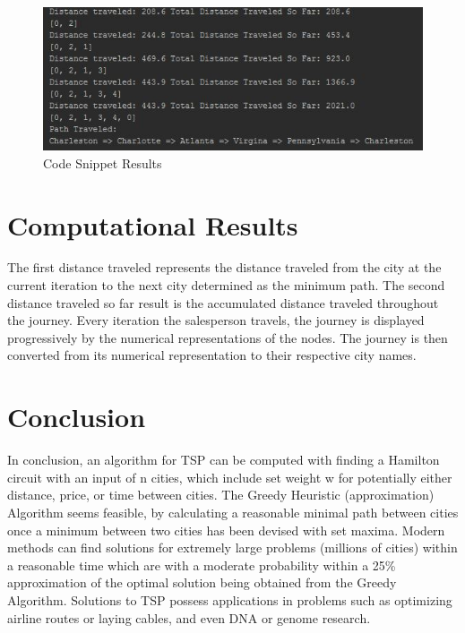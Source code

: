 \documentclass[a4paper,11pt]{scrartcl}
\begin{document}
\begin{figure}[!h]
  \centering
  \begin{minipage}[b]{0.85\textwidth}
    \includegraphics[width=\textwidth]{igraphprojectsnippet}
    \caption{Code Snippet Results}
  \end{minipage}
\end{figure}

\section{Computational Results}

The first distance traveled represents the distance traveled from the city at the current iteration to the next city determined as the minimum path. The second distance traveled so far result is the accumulated distance traveled throughout the journey. Every iteration the salesperson travels, the journey is displayed progressively by the numerical representations of the nodes. The journey is then converted from its numerical representation to their respective city names.

\section{Conclusion}

In conclusion, an algorithm for TSP can be computed with finding a Hamilton circuit with an input of n cities, which include set weight w for potentially either distance, price, or time between cities. The Greedy Heuristic (approximation) Algorithm seems feasible, by calculating a reasonable minimal path between cities once a minimum between two cities has been devised with set maxima. Modern methods can find solutions for extremely large problems (millions of cities) within a reasonable time which are with a moderate probability within a 25\% approximation of the optimal solution being obtained from the Greedy Algorithm. Solutions to TSP possess applications in problems such as optimizing airline routes or laying cables, and even DNA or genome research.
\end{document}
